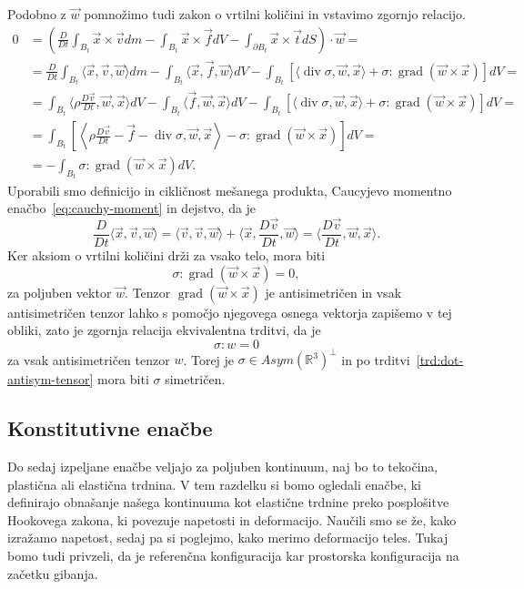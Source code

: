 \documentclass[a4paper,twoside]{article}
\theoremstyle{definition} %
\theoremstyle{plain} %
\numberwithin{equation}{section}
\newcommand{\R}{\mathbb R}
\renewcommand{\div}{\operatorname{div}}
\newcommand{\grad}{\operatorname{grad}}
\newcommand{\DD}[2]{\ensuremath{\frac{D #1}{D #2}}}
\newcommand{\DDt}[1]{\DD{#1}{t}}
\newcommand{\vv}{\vec{v}}
\newcommand{\vt}{\vec{t}}
\newcommand{\vw}{\vec{w}}
\newcommand{\vf}{\vec{f}}
\newcommand{\vx}{\vec{x}}
\newcommand{\ts}{\sigma}
\begin{document}
Podobno z $\vw$ pomnožimo tudi zakon o vrtilni količini in vstavimo zgornjo
relacijo.
\begin{align*}
  0 &= \left(\DDt{}\int_{B_t}\vx \times \vv dm - \int_{B_t} \vx \times \vf dV -
  \int_{\partial B_t} \vx\times\vt dS\right)\cdot \vw = \\ &=
  \DDt{}\int_{B_t}\langle \vx, \vv, \vw\rangle  dm - \int_{B_t} \langle \vx,
  \vf, \vw\rangle dV - \int_{B_t} [\langle \div \ts, \vw, \vx\rangle +  \ts :
  \grad (\vw \times \vx)] dV = \\ &=
  \int_{B_t}\langle \rho \DDt\vv, \vw, \vx \rangle  dV - \int_{B_t} \langle \vf,
  \vw, \vx\rangle dV - \int_{B_t} [\langle \div \ts, \vw, \vx\rangle +  \ts :
  \grad (\vw \times \vx)] dV = \\ &=
\int_{B_t}\left[ \left\langle\rho \DDt\vv - \vf - \div \ts, \vw, \vx\right\rangle -  \ts : \grad
  (\vw \times \vx)\right] dV = \\ &=
- \int_{B_t} \ts : \grad (\vw \times \vx) dV.
\end{align*}
Uporabili smo definicijo in cikličnost mešanega produkta, Caucyjevo momentno
enačbo~\eqref{eq:cauchy-moment} in dejstvo, da je
\[
  \DDt{}\langle \vx, \vv, \vw \rangle =
  \langle \vv, \vv, \vw \rangle +
  \langle \vx, \DDt\vv, \vw \rangle =
  \langle \DDt\vv, \vw, \vx \rangle.
\]
Ker aksiom o vrtilni količini drži za vsako telo, mora biti
\[
  \ts : \grad (\vw \times \vx) = 0,
\]
za poljuben vektor $\vw$. Tenzor $\grad (\vw \times \vx)$ je antisimetričen in
vsak antisimetričen tenzor lahko s pomočjo njegovega osnega vektorja zapišemo v
tej obliki, zato je zgornja relacija ekvivalentna trditvi, da je
\[ \ts : w = 0\] za vsak antisimetričen tenzor $w$.
Torej je $\ts \in Asym(\R^3)^\perp$ in po trditvi~\ref{trd:dot-antisym-tensor}
mora biti $\ts$ simetričen.
\endproof

\subsection{Konstitutivne enačbe}
Do sedaj izpeljane enačbe veljajo za poljuben kontinuum, naj bo to tekočina,
plastična ali elastična trdnina. V tem razdelku si bomo ogledali enačbe, ki
definirajo obnašanje našega kontinuuma kot elastične trdnine preko posplošitve
Hookovega zakona, ki povezuje napetosti in deformacijo. Naučili smo se že, kako
izražamo napetost, sedaj pa si poglejmo, kako merimo deformacijo teles.
Tukaj bomo tudi privzeli, da je referenčna konfiguracija kar prostorska
konfiguracija na začetku gibanja.
\end{document}

